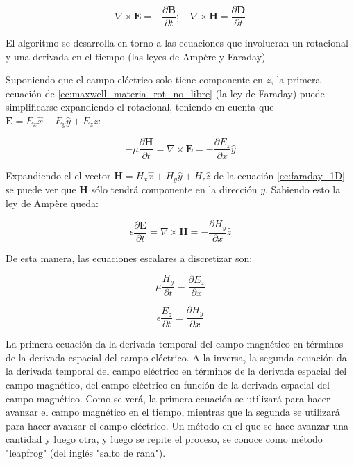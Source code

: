 \begin{equation}\label{ec:maxwell_materia_rot_no_libre}
    \nabla\times\mathbf{E} = - \frac{\partial\mathbf{B}}{\partial t}; \quad \nabla\times \mathbf{H} = \frac{\partial\mathbf{D}}{\partial t}
\end{equation}

El algoritmo se desarrolla en torno a las ecuaciones que involucran un rotacional y una derivada en el tiempo (las leyes de Ampère y Faraday)-

Suponiendo que el campo eléctrico solo tiene componente en $z$, la primera ecuación de \ref{ec:maxwell_materia_rot_no_libre} (la ley de Faraday) puede simplificarse expandiendo el rotacional, teniendo en cuenta que $\textbf{E} = E_x \hat{x} + E_y \hat{y} + E_z \hat{z}$:

\begin{equation}\label{ec:faraday_1D}
    -\mu \frac{\partial \textbf{H}}{\partial t} = \nabla \times \textbf{E} = -\frac{\partial E_z}{\partial x} \hat y
\end{equation}

Expandiendo el el vector $\textbf{H} = H_x \hat{x} + H_y \hat{y} + H_z \hat{z}$ de la ecuación \ref{ec:faraday_1D} se puede ver que $\textbf{H}$ sólo tendrá componente en la dirección $y$. Sabiendo esto la ley de Ampère queda: 

\begin{equation}
    \epsilon \frac{\partial \textbf{E}}{\partial t} = \nabla \times \textbf{H} = -\frac{\partial H_y}{\partial x} \hat z
\end{equation}

De esta manera, las ecuaciones escalares a discretizar son:

\begin{equation}
    \mu \frac{H_y}{\partial t} = \frac{\partial E_z}{\partial x}
\end{equation}

\begin{equation}
    \epsilon \frac{E_z}{\partial t} = \frac{\partial H_y}{\partial x}
\end{equation}

La primera ecuación da la derivada temporal del campo magnético en términos de la derivada espacial del campo eléctrico. A la inversa, la segunda ecuación da la derivada temporal del campo eléctrico en términos de la derivada espacial del campo magnético, del campo eléctrico en función de la derivada espacial del campo magnético. Como se verá, la primera ecuación se utilizará para hacer avanzar el campo magnético en el tiempo, mientras que la segunda se utilizará para hacer avanzar el campo eléctrico. Un método en el que se hace avanzar una cantidad y luego otra, y luego se repite el proceso, se conoce como método "leapfrog" (del inglés "salto de rana").

